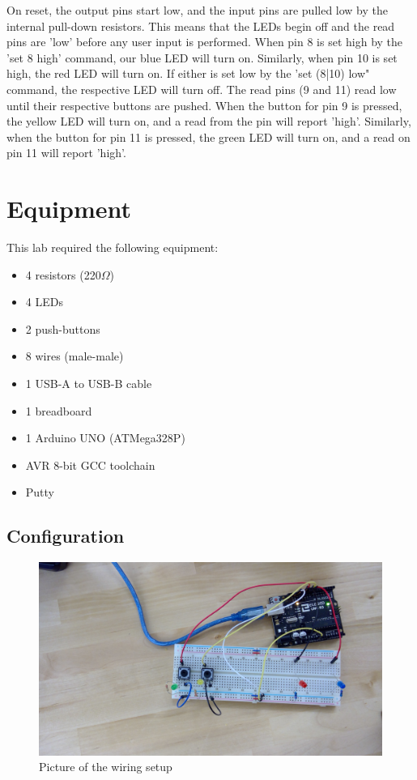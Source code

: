 \documentclass[letterpaper,11pt]{texMemo} %
\begin{document}
On reset, the output pins start low, and the input pins are pulled low by the internal pull-down resistors. This means that the LEDs begin off and the read pins are 'low' before any user input is performed. When pin 8 is set high by the 'set 8 high' command, our blue LED will turn on. Similarly, when pin 10 is set high, the red LED will turn on. If either is set low by the 'set (8|10) low" command, the respective LED will turn off. The read pins (9 and 11) read low until their respective buttons are pushed. When the button for pin 9 is pressed, the yellow LED will turn on, and a read from the pin will report 'high'. Similarly, when the button for pin 11 is pressed, the green LED will turn on, and a read on pin 11 will report 'high'.


\section*{Equipment}
This lab required the following equipment:
\begin{itemize}
\item 4 resistors (220$\Omega$)
\item 4 LEDs
\item 2 push-buttons
\item 8 wires (male-male)
\item 1 USB-A to USB-B cable
\item 1 breadboard
\item 1 Arduino UNO (ATMega328P)
\item AVR 8-bit GCC toolchain
\item Putty
\end{itemize}

\subsection*{Configuration}

\begin{figure}[!ht]
\begin{center}
\includegraphics[width=\linewidth]{./configuration.jpg}
\caption{Picture of the wiring setup}
\end{center}
\end{figure}
\end{document}
